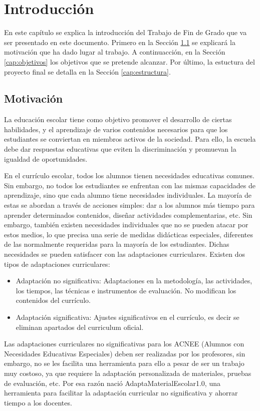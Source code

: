 \chapter{Introducción}
\label{ch:introduccion}

En este capítulo se explica la introducción del Trabajo de Fin de Grado que va ser presentado en este documento. Primero en la Sección \ref{cap:motivacio} se explicará la motivación que ha dado lugar al trabajo. A continuacción, en la Sección \ref{cap:objetivos} los objetivos que se pretende alcanzar. Por último, la estuctura del proyecto final se detalla en la Sección \ref{cap:estructura}.

\section{Motivación}\label{cap:motivacio}
La educación escolar tiene como objetivo promover el desarrollo de ciertas habilidades, y el aprendizaje de varios contenidos necesarios para que los estudiantes se conviertan en miembros activos de la sociedad. Para ello, la escuela debe dar respuestas educativas que eviten la discriminación y promuevan la igualdad de oportunidades.

En el currículo escolar, todos los alumnos tienen necesidades educativas comunes. Sin embargo, no todos los estudiantes se enfrentan con las mismas capacidades de aprendizaje, sino que cada alumno tiene necesidades individuales. La mayoría de estas se abordan a través de acciones simples: dar a los alumnos más tiempo para aprender determinados contenidos, diseñar actividades complementarias, etc.  Sin embargo, también existen necesidades individuales que no se pueden atacar por estos medios, lo que precisa una serie de medidas didácticas especiales, diferentes de las normalmente requeridas para la mayoría de los estudiantes. Dichas necesidades se pueden satisfacer con las adaptaciones curriculares. Existen dos tipos de adaptaciones curriculares:
\begin{itemize}
    \item Adaptación no significativa: Adaptaciones en la metodología, las actividades, los tiempos,
    las técnicas e instrumentos de evaluación. No modifican los contenidos del currículo.  
    \item Adaptación significativa: Ajustes significativos en el currículo, es decir se eliminan apartados del curriculum oficial. 
\end{itemize}
Las adaptaciones curriculares no significativas para los ACNEE (Alumnos con Necesidades Educativas Especiales) deben ser realizadas por los profesores, sin embargo, no se les facilita una herramienta para ello a pesar de ser un trabajo muy costoso, ya que requiere la adaptación personalizada de materiales, pruebas de evaluación, etc. Por esa razón nació AdaptaMaterialEscolar1.0, una herramienta para facilitar la adaptación curricular no significativa y ahorrar tiempo a los docentes.

